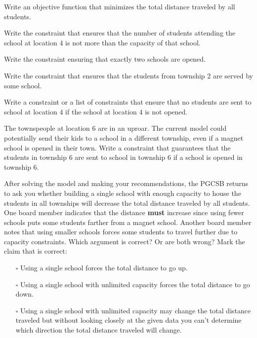 \newpage

\begin{parts}
     Write an objective function that minimizes the total distance traveled by all students.  

\vfill
    
     Write the constraint that ensures that the number of students attending the school at location 4 is not more than the capacity of that school. 

\vfill
    
     Write the constraint ensuring that exactly two schools are opened. 

    \vfill

     Write the constraint that ensures that the students from township 2 are served by some school. 

    \vfill
    
     Write a constraint or a list of constraints that ensure that no students are sent to school at location 4 if the school at location 4 is not opened. 
    
    \vfill
    
   \newpage
    
      The townspeople at location 6 are in an uproar. The current model could potentially send their kids to a school in a different township, even if a magnet school is opened in their town. Write a constraint that guarantees that the students in township 6 are sent to school in township 6 if a school is opened in township 6. 
    
    

\vspace{3in}

 After solving the model and making your recommendations, the PGCSB returns to ask you whether building a single school with enough capacity to house the students in all townships will decrease the total distance traveled by all students. One board member indicates that the distance {\bf must} increase since using fewer schools puts some students farther from a magnet school. Another board member notes that using smaller schools forces some students to travel further due to capacity constraints. Which argument is correct? Or are both wrong? Mark the claim that is correct: 

\begin{itemize}
\item[$\square$] Using a single school forces the total distance to go up. 

\item[$\square$] Using a single school with unlimited capacity forces the total distance to go down. 

\item[$\square$] Using a single school with unlimited capacity may change the total distance traveled but without looking closely at the given data you can't determine which direction the total distance traveled will change. 
\end{itemize}

\vspace{0.33in}

\end{parts}

